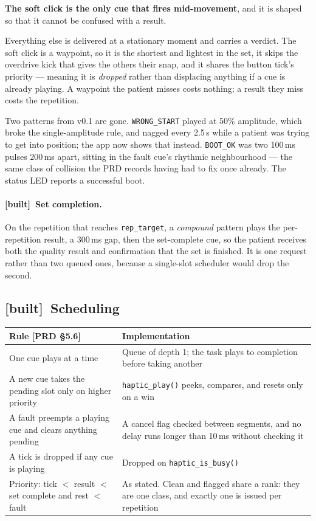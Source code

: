 \documentclass[11pt]{article}
\newcommand{\built}{{\sffamily\scriptsize\color{good}\textbf{[built]}}\ }
\begin{document}
\begin{callout}
\textbf{The soft click is the only cue that fires mid-movement}, and it is
shaped so that it cannot be confused with a result.

\medskip
Everything else is delivered at a stationary moment and carries a verdict. The
soft click is a waypoint, so it is the shortest and lightest in the set, it
skips the overdrive kick that gives the others their snap, and it shares the
button tick's priority --- meaning it is \emph{dropped} rather than displacing
anything if a cue is already playing. A waypoint the patient misses costs
nothing; a result they miss costs the repetition.

\medskip
Two patterns from v0.1 are gone. \texttt{WRONG\_START} played at 50\%
amplitude, which broke the single-amplitude rule, and nagged every 2.5\,s
while a patient was trying to get into position; the app now shows that
instead. \texttt{BOOT\_OK} was two 100\,ms pulses 200\,ms apart, sitting in
the fault cue's rhythmic neighbourhood --- the same class of collision the PRD
records having had to fix once already. The status LED reports a successful
boot.
\end{callout}

\paragraph{\built Set completion.} On the repetition that reaches
\texttt{rep\_target}, a \emph{compound} pattern plays the per-repetition
result, a 300\,ms gap, then the set-complete cue, so the patient receives both
the quality result and confirmation that the set is finished. It is one
request rather than two queued ones, because a single-slot scheduler would
drop the second.

\subsection{\built Scheduling}

\begin{table}[H]
\centering\small
\begin{tabularx}{\linewidth}{@{}p{52mm} X@{}}
\toprule
\textbf{Rule [PRD \S5.6]} & \textbf{Implementation} \\
\midrule
One cue plays at a time & Queue of depth 1; the task plays to completion before taking another \\
A new cue takes the pending slot only on higher priority & \texttt{haptic\_play()} peeks, compares, and resets only on a win \\
A fault preempts a playing cue and clears anything pending & A cancel flag checked between segments, and no delay runs longer than 10\,ms without checking it \\
A tick is dropped if any cue is playing & Dropped on \texttt{haptic\_is\_busy()} \\
Priority: tick $<$ result $<$ set complete and rest $<$ fault & As stated. Clean and flagged share a rank: they are one class, and exactly one is issued per repetition \\
\bottomrule
\end{tabularx}
\end{table}
\end{document}
